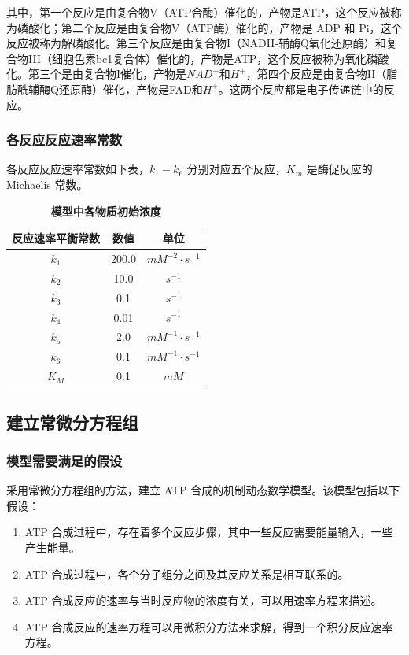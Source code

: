 \documentclass{ctexart}
\begin{document}
其中，第一个反应是由复合物V（ATP合酶）催化的，产物是ATP，这个反应被称为磷酸化；第二个反应是由复合物V（ATP酶）催化的，产物是 ADP 和 Pi，这个反应被称为解磷酸化。第三个反应是由复合物I（NADH-辅酶Q氧化还原酶）和复合物III（细胞色素bc1复合体）催化的，产物是ATP，这个反应被称为氧化磷酸化。第三个是由复合物I催化，产物是$NAD^+$和$H^+$，第四个反应是由复合物II（脂肪酰辅酶Q还原酶）催化，产物是FAD和$H^+$。这两个反应都是电子传递链中的反应。

\subsubsection{各反应反应速率常数}
各反应反应速率常数如下表，$k_1 - k_6$ 分别对应五个反应，$K_m$ 是酶促反应的 Michaelis 常数。

\begin{table}[H]
    \centering
    \begin{tabular}{ccc}
        \toprule
        反应速率平衡常数 & 数值 & 单位\\
        \midrule
        $k_1$ & 200.0 & $mM^{-2} \cdot s^{-1}$\\
        $k_2$ & 10.0 & $s^{-1}$\\
        $k_3$ & 0.1 & $s^{-1}$\\
        $k_4$ & 0.01 & $s^{-1}$\\
        $k_5$ & 2.0 & $mM^{-1} \cdot s^{-1}$\\
        $k_6$ & 0.1 & $mM^{-1} \cdot s^{-1}$\\
        $K_M$ & 0.1 & $mM$ \\
        \bottomrule
    \end{tabular}
    \caption{\textbf{模型中各物质初始浓度}}
\end{table}

\subsection{建立常微分方程组}
\subsubsection{模型需要满足的假设}

采用常微分方程组的方法，建立 ATP 合成的机制动态数学模型。该模型包括以下假设：

\begin{enumerate}
    \item ATP 合成过程中，存在着多个反应步骤，其中一些反应需要能量输入，一些产生能量。
    \item ATP 合成过程中，各个分子组分之间及其反应关系是相互联系的。
    \item ATP 合成反应的速率与当时反应物的浓度有关，可以用速率方程来描述。
    \item ATP 合成反应的速率方程可以用微积分方法来求解，得到一个积分反应速率方程。
\end{enumerate}
\end{document}
